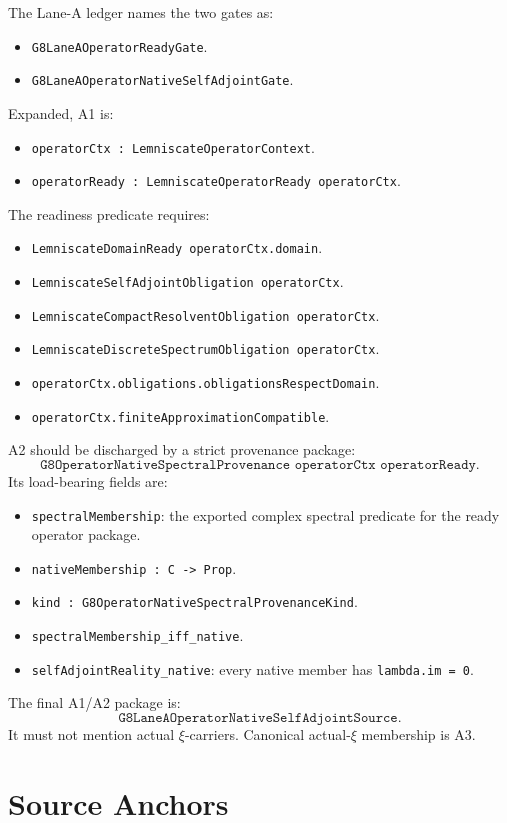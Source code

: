 \documentclass[11pt]{article}
\begin{document}
The Lane-A ledger names the two gates as:
\begin{itemize}
\item \texttt{G8LaneAOperatorReadyGate}.
\item \texttt{G8LaneAOperatorNativeSelfAdjointGate}.
\end{itemize}
Expanded, A1 is:
\begin{itemize}
\item \texttt{operatorCtx : LemniscateOperatorContext}.
\item \texttt{operatorReady : LemniscateOperatorReady operatorCtx}.
\end{itemize}
The readiness predicate requires:
\begin{itemize}
\item \texttt{LemniscateDomainReady operatorCtx.domain}.
\item \texttt{LemniscateSelfAdjointObligation operatorCtx}.
\item \texttt{LemniscateCompactResolventObligation operatorCtx}.
\item \texttt{LemniscateDiscreteSpectrumObligation operatorCtx}.
\item \texttt{operatorCtx.obligations.obligationsRespectDomain}.
\item \texttt{operatorCtx.finiteApproximationCompatible}.
\end{itemize}
A2 should be discharged by a strict provenance package:
\[
  \texttt{G8OperatorNativeSpectralProvenance operatorCtx operatorReady}.
\]
Its load-bearing fields are:
\begin{itemize}
\item \texttt{spectralMembership}: the exported complex spectral predicate for
  the ready operator package.
\item \texttt{nativeMembership : C -> Prop}.
\item \texttt{kind : G8OperatorNativeSpectralProvenanceKind}.
\item \texttt{spectralMembership\_iff\_native}.
\item \texttt{selfAdjointReality\_native}: every native member has
  \texttt{lambda.im = 0}.
\end{itemize}
The final A1/A2 package is:
\[
  \texttt{G8LaneAOperatorNativeSelfAdjointSource}.
\]
It must not mention actual \(\xi\)-carriers.  Canonical actual-\(\xi\)
membership is A3.

\section*{Source Anchors}
\end{document}
